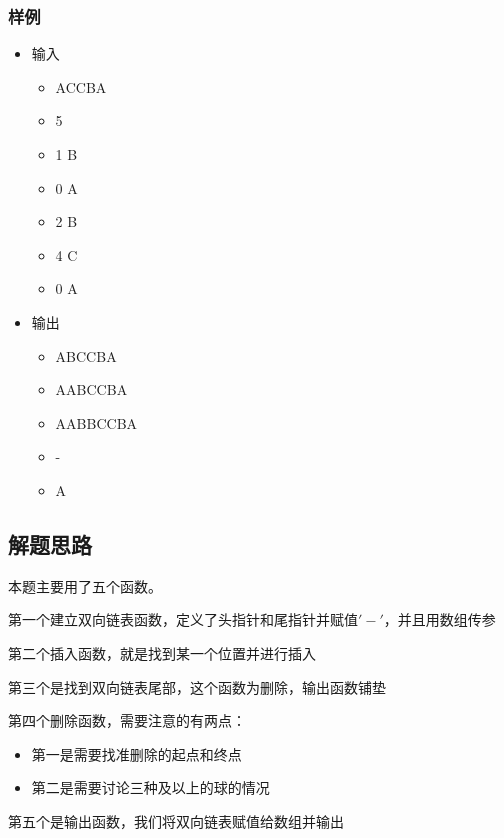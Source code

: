 \documentclass[UTF8]{ctexart}
\begin{document}
	\subsubsection{样例}
	\begin{itemize}
	\item 输入
		\begin{itemize}
			\item[ ]ACCBA
			\item[ ]5
			\item[ ]1 B
			\item[ ]0 A
			\item[ ]2 B
			\item[ ]4 C
			\item[ ]0 A
		\end{itemize}
	\item 输出
		\begin{itemize}
			\item[ ]ABCCBA
			\item[ ]AABCCBA
			\item[ ]AABBCCBA
			\item[ ]-
			\item[ ]A	
		\end{itemize}
	\end{itemize}
\subsection{解题思路}
本题主要用了五个函数。\par
第一个建立双向链表函数，定义了头指针和尾指针并赋值$'-'$，并且用数组传参\par
第二个插入函数，就是找到某一个位置并进行插入\par
第三个是找到双向链表尾部，这个函数为删除，输出函数铺垫\par
第四个删除函数，需要注意的有两点：
\begin{itemize}
  \item 第一是需要找准删除的起点和终点
  \item 第二是需要讨论三种及以上的球的情况
\end{itemize}
第五个是输出函数，我们将双向链表赋值给数组并输出
\end{document}
